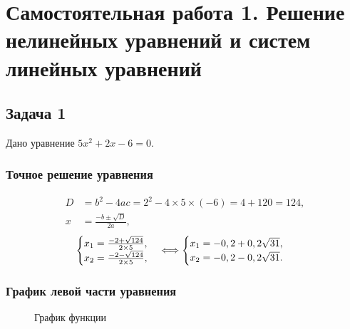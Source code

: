 \documentclass[10pt, a4paper, titlepage]{article}
\begin{document}
\newpage
\section{Самостоятельная работа \textnumero{} 1. Решение нелинейных уравнений и систем линейных уравнений}

\subsection{Задача 1}

Дано уравнение $5x^2+2x-6=0$.

\subsubsection*{Точное решение уравнения}

\begin{align*}
D &= b^2-4ac=2^2-4\times5\times(-6)=4+120=124, \\
x &= \frac{-b\pm\sqrt{D}}{2a},
\end{align*}
\begin{equation*}
    \begin{cases}
        $$x_1=\frac{-2+\sqrt{124}}{2\times5}$$, \\
        $$x_2=\frac{-2-\sqrt{124}}{2\times5}$$,
    \end{cases}
    \Longleftrightarrow
    \begin{cases}
        $$x_1=-0,2+0,2\sqrt{31}$$, \\
        $$x_2=-0,2-0,2\sqrt{31}$$.
    \end{cases}
\end{equation*} 

\subsubsection*{График левой части уравнения}
\begin{figure}[H]
    \centering
    \caption{График функции}
    \label{sr1Task1Function}
\end{figure}
\end{document}
